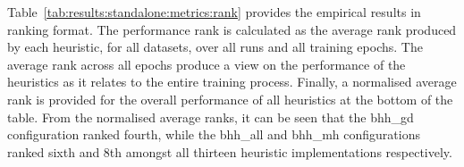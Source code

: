 Table~\ref{tab:results:standalone:metrics:rank} provides the empirical results in ranking format. The performance rank is calculated as the average rank produced by each heuristic, for all datasets, over all runs and all training epochs. The average rank across all epochs produce a view on the performance of the heuristics as it relates to the entire training process. Finally, a normalised average rank is provided for the overall performance of all heuristics at the bottom of the table. From the normalised average ranks, it can be seen that the bhh\_gd configuration ranked fourth, while the bhh\_all and bhh\_mh configurations ranked sixth and 8th amongst all thirteen heuristic implementations respectively.

